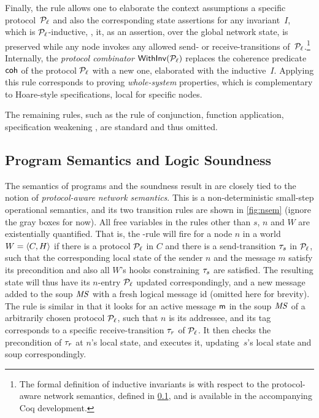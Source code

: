 Finally, the rule  allows one to elaborate the context
assumptions \wrt a specific protocol~$\mathcal{P}_\ell$ and also the
corresponding state assertions for any invariant~$I$, which is
$\mathcal{P}_\ell$-inductive, \ie, it, as an assertion, over the global
network state, is preserved while any node invokes any allowed send-
or receive-transitions of~$\mathcal{P}_\ell$.\footnote{The formal definition
  of inductive invariants is with respect to the protocol-aware
  network semantics, defined in \cref{sec:soundness}, and is
  available in the accompanying Coq development.}
%
Internally, the \emph{protocol combinator} $\mathsf{WithInv}(\mathcal{P}_\ell)$
replaces the coherence predicate $\mathsf{coh}$ of the protocol $\mathcal{P}_\ell$
with a new one, elaborated with the inductive~$I$.
%
Applying this rule corresponds to proving \emph{whole-system}
properties, which is complementary to Hoare-style specifications,
local for specific nodes.

The remaining rules, such as the rule of conjunction, function
application, specification weakening \etc, are standard and thus
omitted.



\subsection{Program Semantics and Logic Soundness}
\label{sec:soundness}


The semantics of programs and the soundness result in \disel are
closely tied to the notion of \emph{protocol-aware network semantics}.
%
This is a non-deterministic small-step operational semantics, and its
two transition rules are shown in \cref{fig:nsem} (ignore the
gray boxes for now).
%
All free variables in the rules other than $s$, $n$ and $W$ are
existentially quantified. That is, the -rule will
fire for a node $n$ in a world $W = \langle{C, H}\rangle$ if there is a
protocol $\mathcal{P}_\ell$ in $C$ and there is a send-transition $\tau_s$
in $\mathcal{P}_{\ell}$, such that the corresponding local state of the
sender $n$ and the message $m$ satisfy its precondition and also all
$W$'s hooks constraining $\tau_s$ are satisfied. The resulting state
will thus have its $n$-entry \wrt $\mathcal{P}_{\ell}$ updated
correspondingly, and a new message added to the soup $\mathit{MS}$ with a
fresh logical message id (omitted here for brevity).
%
The rule  is similar in that it looks for an active
message $\mathsf{m}$ in the soup $\mathit{MS}$ of a arbitrarily chosen protocol
$\mathcal{P}_{\ell}$, such that $n$ is its addressee, and its tag corresponds
to a specific receive-transition $\tau_r$ of $\mathcal{P}_{\ell}$. It then
checks the precondition of $\tau_r$ at $n$'s local state, and
executes it, updating~$s$'s local state and soup correspondingly.

